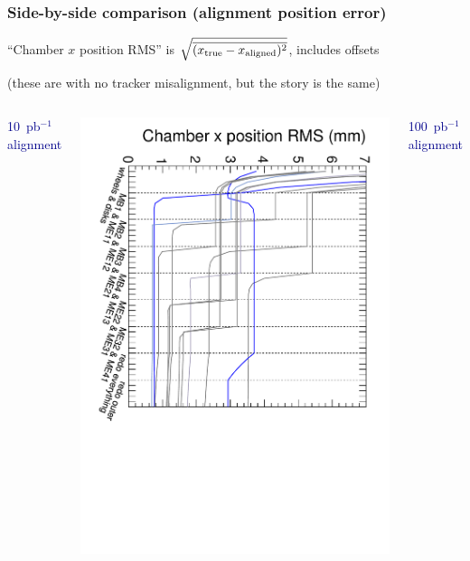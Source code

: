 \documentclass[compress]{beamer}
\begin{document}
\begin{frame}
\frametitle{Side-by-side comparison (alignment position error)}

``Chamber $x$ position RMS'' is $\sqrt{\overline{(x_{\mbox{\scriptsize true}} - x_{\mbox{\scriptsize aligned}})^2}}$, includes offsets

\vspace{0.1 cm}
(these are with no tracker misalignment, but the story is the same)

\vspace{-0.2 cm}
\begin{columns}
\begin{center} \textcolor{darkblue}{10~pb$^{-1}$ alignment} \end{center}

\vspace{-0.25 cm}
\includegraphics[height=\linewidth, angle=90]{convergence-10.pdf}

\begin{center} \textcolor{darkblue}{100~pb$^{-1}$ alignment} \end{center}


\end{columns}
\end{frame}
\end{document}
